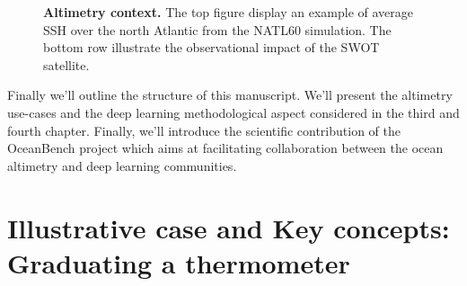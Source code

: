 \begin{bibunit}
\begin{figure}[h]

\centering    
    \caption{\textbf{Altimetry context.} The top figure display an example of average SSH over the north Atlantic from the NATL60 simulation. The bottom row illustrate the observational impact of the SWOT satellite.  }
    \label{fig:ssh_intro}
\end{figure}



  Finally we'll outline the structure of this manuscript. We'll present the altimetry use-cases and the deep learning methodological aspect considered in the third and fourth chapter. Finally, we'll introduce the scientific contribution of the OceanBench project which aims at facilitating collaboration between the ocean altimetry and deep learning communities.
  


  \section{Illustrative case and Key concepts: Graduating a thermometer}



\end{bibunit}
